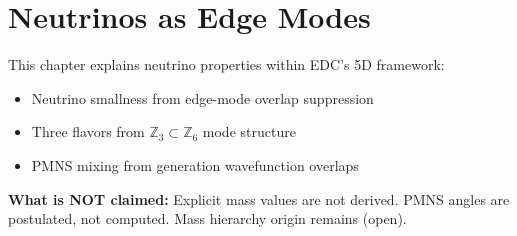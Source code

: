 
\section{Neutrinos as Edge Modes}
\label{sec:ch6_neutrinos}

\begin{tcolorbox}[edcGuardrail, title=\textbf{Epistemic Status}]
This chapter explains neutrino properties within EDC's 5D framework:
\begin{itemize}[nosep]
    \item Neutrino smallness from edge-mode overlap suppression \tagDc{}
    \item Three flavors from $\mathbb{Z}_3 \subset \mathbb{Z}_6$ mode structure \tagI{}
    \item PMNS mixing from generation wavefunction overlaps \tagP{}
\end{itemize}
\textbf{What is NOT claimed:} Explicit mass values are not derived. PMNS angles
are postulated, not computed. Mass hierarchy origin remains (open).
\end{tcolorbox}


